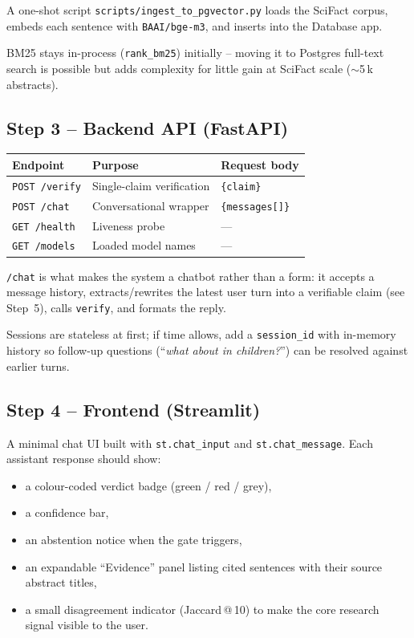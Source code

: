 \documentclass[11pt,a4paper]{article}
\begin{document}
A one-shot script \texttt{scripts/ingest\_to\_pgvector.py} loads the
SciFact corpus, embeds each sentence with \texttt{BAAI/bge-m3}, and
inserts into the Database app.

BM25 stays in-process (\texttt{rank\_bm25}) initially -- moving it to
Postgres full-text search is possible but adds complexity for little
gain at SciFact scale ($\sim$5\,k abstracts).

\subsection{Step 3 -- Backend API (FastAPI)}

\begin{center}
\begin{tabular}{@{}lll@{}}
\toprule
\textbf{Endpoint} & \textbf{Purpose} & \textbf{Request body} \\
\midrule
\texttt{POST /verify} & Single-claim verification & \texttt{\{claim\}} \\
\texttt{POST /chat}   & Conversational wrapper    & \texttt{\{messages[]\}} \\
\texttt{GET  /health} & Liveness probe            & --- \\
\texttt{GET  /models} & Loaded model names        & --- \\
\bottomrule
\end{tabular}
\end{center}

\texttt{/chat} is what makes the system a chatbot rather than a form: it
accepts a message history, extracts/rewrites the latest user turn into a
verifiable claim (see Step~5), calls \texttt{verify}, and formats the
reply.

Sessions are stateless at first; if time allows, add a \texttt{session\_id}
with in-memory history so follow-up questions (``\textit{what about in
children?}'') can be resolved against earlier turns.

\subsection{Step 4 -- Frontend (Streamlit)}

A minimal chat UI built with \texttt{st.chat\_input} and
\texttt{st.chat\_message}. Each assistant response should show:

\begin{itemize}
  \item a colour-coded verdict badge (green / red / grey),
  \item a confidence bar,
  \item an abstention notice when the gate triggers,
  \item an expandable ``Evidence'' panel listing cited sentences with
        their source abstract titles,
  \item a small disagreement indicator (Jaccard\,@\,10) to make the core
        research signal visible to the user.
\end{itemize}
\end{document}
